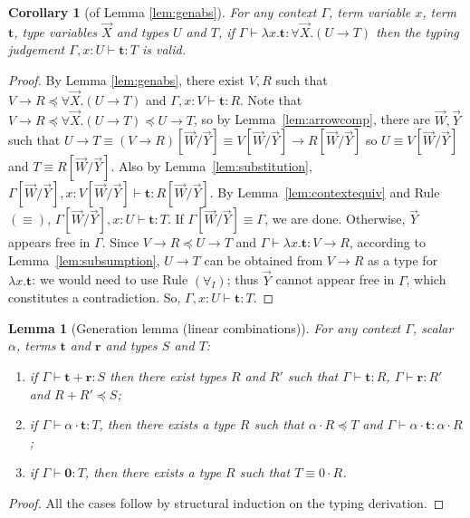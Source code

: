 \documentclass[colorlinks=true,linkcolor=black,urlcolor=black,citecolor=blue,submission,copyright,creativecommons]{eptcs}
\newtheorem{lemma}[theorem]{Lemma}
\newtheorem{corollary}[theorem]{Corollary}
\newcommand{\ve}[1]{\mathrm{\textbf{#1}}}
\newcommand{\type}{\colon\!}
\begin{document}
\begin{corollary}[of Lemma \ref{lem:genabs}]\label{cor:genabs} For any
  context $\Gamma$, term variable $x$, term $\ve t$, type variables
  $\vec X$ and types $U$ and $T$, if
  $\Gamma\vdash\lambda{x}.\ve{t}\type \forall\vec{X}.(U\to T)$ then the
  typing judgement $\Gamma,x\type U\vdash\ve{t}\type T$ is valid.
\end{corollary}
\begin{proof}
  By Lemma \ref{lem:genabs}, there exist $V,R$ such that $V\to
  R\preceq\forall\vec{X}.(U\to T)$ and $\Gamma,x\type
  V\vdash\ve{t}\type R$. Note that $V\to R\preceq\forall\vec{X}.(U\to
  T)\preceq U\to T$, so by Lemma~\ref{lem:arrowcomp}, there are
  $\vec{W},\vec{Y}$ such that $U\to T\equiv(V\to
  R)[\vec{W}/\vec{Y}]\equiv V[\vec{W}/\vec{Y}]\to R[\vec{W}/\vec{Y}]$
  so $U\equiv V[\vec{W}/\vec{Y}]$ and $T\equiv
  R[\vec{W}/\vec{Y}]$. Also by Lemma~\ref{lem:substitution},
  $\Gamma[\vec{W}/\vec{Y}],x\type V[\vec{W}/\vec{Y}]\vdash\ve{t}\type
  R[\vec{W}/\vec{Y}]$. By Lemma~\ref{lem:contextequiv} and Rule
  $(\equiv)$, $\Gamma[\vec{W}/\vec{Y}],x\type U\vdash\ve{t}\type
  T$. If $\Gamma[\vec{W}/\vec{Y}]\equiv\Gamma$, we are done. Otherwise, $\vec{Y}$ appears free in $\Gamma$. 
Since $V\to R\preceq U\to T$ and $\Gamma\vdash\lambda x.\ve t\type V\to R$, according to Lemma~\ref{lem:subsumption}, $U\to T$ can be obtained from $V\to R$ as a type for $\lambda x.\ve{t}$: we would need to use Rule $(\forall_I)$; thus $\vec{Y}$ cannot appear free in $\Gamma$, which constitutes a contradiction. So, $\Gamma,x\type U\vdash\ve{t}\type T$.
\end{proof}

\begin{lemma}[Generation lemma (linear combinations)]\label{lem:genLinComb}
    For any context $\Gamma$, scalar $\alpha$, terms $\ve t$ and $\ve r$
  and types $S$ and $T$:
  \begin{enumerate}
   \item if $\Gamma\vdash\ve{t}+\ve{r}\type S$ then there exist types $R$ and
  $R'$ such that $\Gamma\vdash\ve{t}\type R$, $\Gamma\vdash\ve{r}\type
  R'$ and $R+R'\preceq S$;
  \item if $\Gamma\vdash\alpha\cdot \ve{t}\type T$, then there exists a type
  $R$ such that $\alpha\cdot R\preceq T$ and $\Gamma\vdash\alpha\cdot
  \ve{t}\type\alpha\cdot R$;
  \item if $\Gamma\vdash\ve{0}\type T$, then there exists a type $R$ such
  that $T\equiv 0\cdot R$.
    \end{enumerate}
\end{lemma}
\begin{proof}
 All the cases follow by structural induction on the typing derivation.
\end{proof}
\end{document}
